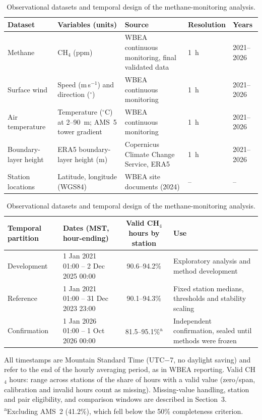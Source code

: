 \begin{table}[t]
\centering
\caption{Observational datasets and temporal design of the methane-monitoring analysis.}
\label{tab:data}
\begin{tabularx}{\textwidth}{@{}l>{\raggedright\arraybackslash}X>{\raggedright\arraybackslash}Xll@{}}
\toprule
Dataset & Variables (units) & Source & Resolution & Years \\
\midrule
Methane & CH$_4$ (ppm) & WBEA continuous monitoring, final validated data & 1~h & 2021--2026 \\
Surface wind & Speed (m\,s$^{-1}$) and direction ($^\circ$) & WBEA continuous monitoring & 1~h & 2021--2026 \\
Air temperature & Temperature ($^\circ$C) at 2--90~m; AMS~5 tower gradient & WBEA continuous monitoring & 1~h & 2021--2026 \\
Boundary-layer height & ERA5 boundary-layer height (m) & Copernicus Climate Change Service, ERA5 & 1~h & 2021--2026 \\
Station locations & Latitude, longitude (WGS84) & WBEA site documents (2024) & -- & -- \\
\bottomrule
\end{tabularx}
\par\medskip
\begin{tabularx}{\textwidth}{@{}llc>{\raggedright\arraybackslash}X@{}}
\toprule
Temporal partition & Dates (MST, hour-ending) & Valid CH$_4$ hours by station & Use \\
\midrule
Development & 1 Jan 2021 01:00 -- 2 Dec 2025 00:00 & 90.6--94.2\% & Exploratory analysis and method development \\
Reference & 1 Jan 2021 01:00 -- 31 Dec 2023 23:00 & 90.1--94.3\% & Fixed station medians, thresholds and stability scaling \\
Confirmation & 1 Jan 2026 01:00 -- 1 Oct 2026 00:00 & 81.5--95.1\%\textsuperscript{a} & Independent confirmation, sealed until methods were frozen \\
\bottomrule
\end{tabularx}
\par\smallskip\begin{minipage}{\textwidth}\footnotesize
All timestamps are Mountain Standard Time (UTC$-$7, no daylight saving) and refer to the end of the hourly averaging period, as in WBEA reporting. Valid CH$_4$ hours: range across stations of the share of hours with a valid value (zero/span, calibration and invalid hours count as missing). Missing-value handling, station and pair eligibility, and comparison windows are described in Section~3. \textsuperscript{a}Excluding AMS~2 (41.2\%), which fell below the 50\% completeness criterion.
\end{minipage}
\end{table}
